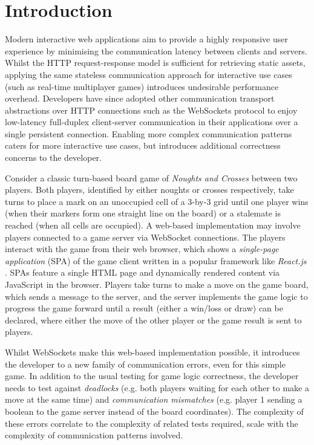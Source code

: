 \section{Introduction}

Modern interactive web applications aim to provide a highly responsive user
experience by minimising the communication latency between clients and servers.
Whilst the HTTP request-response model is sufficient for retrieving static
assets, applying the same stateless communication approach for interactive use
cases (such as real-time multiplayer games) introduces undesirable performance
overhead.
Developers have since adopted other communication transport abstractions over
HTTP connections such as the WebSockets protocol \cite{WebSocketRFC} to enjoy
low-latency full-duplex client-server communication in their applications over
a single persistent connection.
Enabling more complex communication patterns caters for more interactive use
cases, but introduces additional correctness concerns to the developer.

Consider a classic turn-based board game of \textit{Noughts and Crosses}
between two players.
Both players, identified by either noughts or crosses respectively, take
turns to place a mark on an unoccupied cell of a 3-by-3 grid until one player
wins (when their markers form one straight line on the board) or a stalemate is
reached (when all cells are occupied).
A web-based implementation may involve players connected to a game server via
WebSocket connections.
The players interact with the game from their web browser, which shows a
\textit{single-page application} (SPA) of the game client written in a popular
framework like \textit{React.js} \cite{React}.
SPAs feature a single HTML page and dynamically rendered content via JavaScript
in the browser.
Players take turns to make a move on the game board, which sends a message to
the server, and the server implements the game logic to progress the game
forward until a result (either a win/loss or draw) can be declared, where
either the move of the other player or the game result is sent to players.

Whilst WebSockets make this web-based implementation possible, it introduces
the developer to a new family of communication errors, even for this simple
game.
In addition to the usual testing for game logic correctness, the
developer needs to test against \textit{deadlocks} (e.g. both players waiting
for each other to make a move at the same time) and \textit{communication
 mismatches} (e.g. player 1 sending a boolean to the game server instead of
the board coordinates).
The complexity of these errors correlate to the
complexity of related tests required, scale with the complexity of
communication patterns involved.

